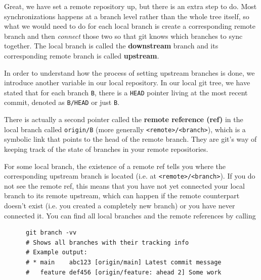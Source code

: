 \documentclass{article}
\begin{document}
    Great, we have set a remote repository up, but there is an extra step to do. Most synchronizations happens at a branch level rather than the whole tree itself, so what we would need to do for each local branch is create a corresponding remote branch and then \textit{connect} those two so that git knows which branches to sync together. The local branch is called the \textbf{downstream} branch and its corresponding remote branch is called \textbf{upstream}. 

    In order to understand how the process of setting upstream branches is done, we introduce another variable in our local repository. In our local git tree, we have stated that for each branch \texttt{B}, there is a \texttt{HEAD} pointer living at the most recent commit, denoted as \texttt{B/HEAD} or just \texttt{B}. 

    \begin{definition} 
      There is actually a second pointer called the \textbf{remote reference (ref)} in the local branch called \texttt{origin/B} (more generally \texttt{<remote>/<branch>}), which is a symbolic link that points to the head of the remote branch. They are git's way of keeping track of the state of branches in your remote repositories. 
    \end{definition} 

    For some local branch, the existence of a remote ref tells you where the corresponding upstream branch is located (i.e. at \texttt{<remote>/<branch>}). If you do not see the remote ref, this means that you have not yet connected your local branch to its remote upstream, which can happen if the remote counterpart doesn't exist (i.e. you created a completely new branch) or you have never connected it. You can find all local branches and the remote references by calling 
    \begin{lstlisting}
      git branch -vv
      # Shows all branches with their tracking info
      # Example output:
      # * main    abc123 [origin/main] Latest commit message
      #   feature def456 [origin/feature: ahead 2] Some work
    \end{lstlisting} 
\end{document}
